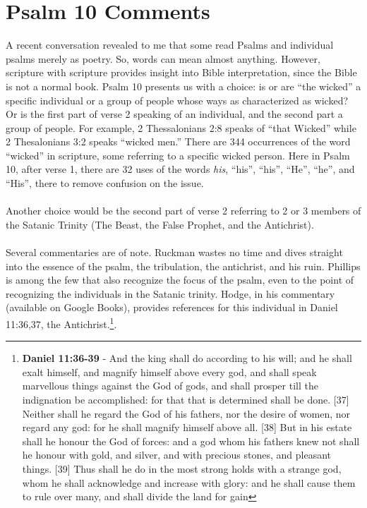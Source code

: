 \section{Psalm 10 Comments}
A recent conversation revealed to me that some read Psalms and individual  psalms merely as poetry. So, words can mean almost anything. However, scripture with scripture provides insight into Bible interpretation, since the Bible is not a normal book. Psalm 10 presents us with a choice: is  or are ``the wicked'' a specific individual or a group of people whose ways as characterized as wicked? Or is the first part of verse 2 speaking of an individual, and the second part a group of people.  For example, 2 Thessalonians 2:8 speaks of ``that Wicked'' while 2 Thesalonians 3:2 speaks ``wicked men.''  There are 344 occurrences of the word ``wicked'' in scripture, some referring to a specific wicked person.  Here in Psalm 10, after verse 1, there are 32 uses of the words \emph{his}, ``his'', ``his'', ``He'', ``he'',  and ``His'', there to remove confusion on the issue.\\
\\
\noindent Another choice would be the second part of verse 2 referring to 2 or 3 members of the Satanic Trinity (The Beast, the False Prophet, and the Antichrist). \\
\\
\noindent Several commentaries are of note. Ruckman wastes no time and dives straight into the essence of the psalm, the tribulation, the antichrist, and his ruin. Phillips is among the few that also recognize the focus of the psalm, even to the point of recognizing the individuals in the Satanic trinity.\cite{Phillips2001ExploringPsalms1}   Hodge, in his commentary (available on Google Books), provides references for this individual in Daniel 11:36,37, the Antichrist.\footnote{\textbf{Daniel 11:36-39} - And the king shall do according to his will; and he shall exalt himself, and magnify himself above every god, and shall speak marvellous things against the God of gods, and shall prosper till the indignation be accomplished: for that that is determined shall be done. [37] Neither shall he regard the God of his fathers, nor the desire of women, nor regard any god: for he shall magnify himself above all. [38] But in his estate shall he honour the God of forces: and a god whom his fathers knew not shall he honour with gold, and silver, and with precious stones, and pleasant things. [39] Thus shall he do in the most strong holds with a strange god, whom he shall acknowledge and increase with glory: and he shall cause them to rule over many, and shall divide the land for gain}.\cite{deBurgh1858PsalmCommentary}\\
